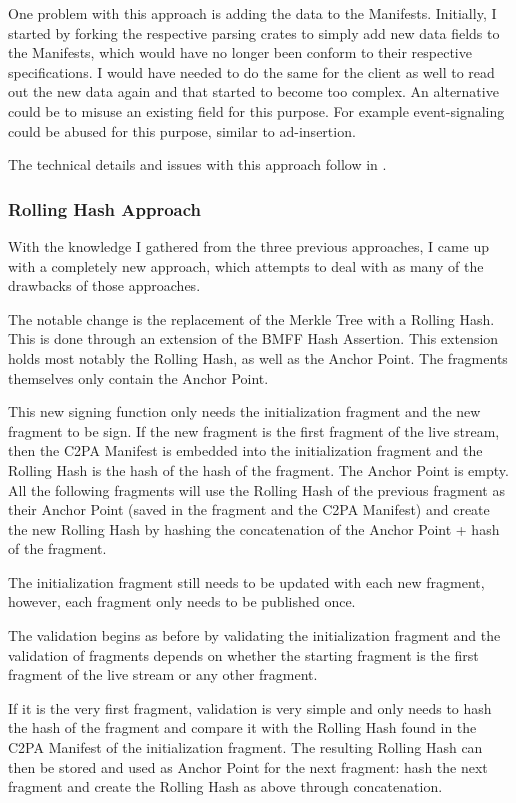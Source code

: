 One problem with this approach is adding the data to the Manifests. Initially, I started by forking the respective parsing crates to simply add new data fields to the Manifests, which would have no longer been conform to their respective specifications. I would have needed to do the same for the client as well to read out the new data again and that started to become too complex. An alternative could be to misuse an existing field for this purpose. For example event-signaling could be abused for this purpose, similar to ad-insertion.

The technical details and issues with this approach follow in .

\subsubsection{Rolling Hash Approach}

With the knowledge I gathered from the three previous approaches, I came up with a completely new approach, which attempts to deal with as many of the drawbacks of those approaches.

The notable change is the replacement of the Merkle Tree with a Rolling Hash. This is done through an extension of the BMFF Hash Assertion. This extension holds most notably the Rolling Hash, as well as the Anchor Point. The fragments themselves only contain the Anchor Point.

This new signing function only needs the initialization fragment and the new fragment to be sign. If the new fragment is the first fragment of the live stream, then the C2PA Manifest is embedded into the initialization fragment and the Rolling Hash is the hash of the hash of the fragment. The Anchor Point is empty. All the following fragments will use the Rolling Hash of the previous fragment as their Anchor Point (saved in the fragment and the C2PA Manifest) and create the new Rolling Hash by hashing the concatenation of the Anchor Point + hash of the fragment.

The initialization fragment still needs to be updated with each new fragment, however, each fragment only needs to be published once.

The validation begins as before by validating the initialization fragment and the validation of fragments depends on whether the starting fragment is the first fragment of the live stream or any other fragment. 

If it is the very first fragment, validation is very simple and only needs to hash the hash of the fragment and compare it with the Rolling Hash found in the C2PA Manifest of the initialization fragment. The resulting Rolling Hash can then be stored and used as Anchor Point for the next fragment: hash the next fragment and create the Rolling Hash as above through concatenation.

